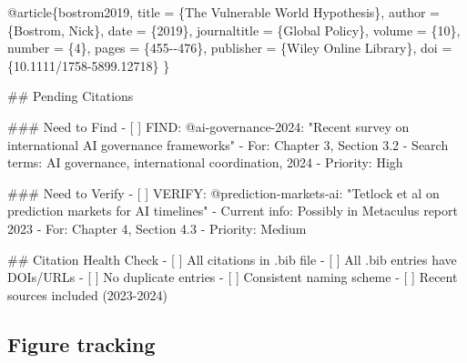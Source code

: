 \documentclass[
  11pt,
  letterpaper,
]{book}
\newenvironment{Shaded}{\begin{snugshade}}{\end{snugshade}}
\newcommand{\FunctionTok}[1]{\textcolor[rgb]{0.28,0.35,0.67}{#1}}
\newcommand{\NormalTok}[1]{\textcolor[rgb]{0.00,0.23,0.31}{#1}}
\newcommand{\SpecialStringTok}[1]{\textcolor[rgb]{0.13,0.47,0.30}{#1}}
\newcommand{\VariableTok}[1]{\textcolor[rgb]{0.07,0.07,0.07}{#1}}
\begin{document}
\begin{Shaded}
\begin{Highlighting}[]
\NormalTok{@article\{bostrom2019,}
\NormalTok{  title = \{The Vulnerable World Hypothesis\},}
\NormalTok{  author = \{Bostrom, Nick\},}
\NormalTok{  date = \{2019\},}
\NormalTok{  journaltitle = \{Global Policy\},}
\NormalTok{  volume = \{10\},}
\NormalTok{  number = \{4\},}
\NormalTok{  pages = \{455{-}{-}476\},}
\NormalTok{  publisher = \{Wiley Online Library\},}
\NormalTok{  doi = \{10.1111/1758{-}5899.12718\}}
\NormalTok{\}}




\FunctionTok{\#\# Pending Citations}

\FunctionTok{\#\#\# Need to Find}
\SpecialStringTok{{-} }\VariableTok{[ ]}\NormalTok{ FIND: @ai{-}governance{-}2024: "Recent survey on international AI governance frameworks"}
\SpecialStringTok{  {-} }\NormalTok{For: Chapter 3, Section 3.2}
\SpecialStringTok{  {-} }\NormalTok{Search terms: AI governance, international coordination, 2024}
\SpecialStringTok{  {-} }\NormalTok{Priority: High}

\FunctionTok{\#\#\# Need to Verify}
\SpecialStringTok{{-} }\VariableTok{[ ]}\NormalTok{ VERIFY: @prediction{-}markets{-}ai: "Tetlock et al on prediction markets for AI timelines"}
\SpecialStringTok{  {-} }\NormalTok{Current info: Possibly in Metaculus report 2023}
\SpecialStringTok{  {-} }\NormalTok{For: Chapter 4, Section 4.3}
\SpecialStringTok{  {-} }\NormalTok{Priority: Medium}


\FunctionTok{\#\# Citation Health Check}
\SpecialStringTok{{-} }\VariableTok{[ ]}\NormalTok{ All citations in .bib file}
\SpecialStringTok{{-} }\VariableTok{[ ]}\NormalTok{ All .bib entries have DOIs/URLs}
\SpecialStringTok{{-} }\VariableTok{[ ]}\NormalTok{ No duplicate entries}
\SpecialStringTok{{-} }\VariableTok{[ ]}\NormalTok{ Consistent naming scheme}
\SpecialStringTok{{-} }\VariableTok{[ ]}\NormalTok{ Recent sources included (2023{-}2024)}

\end{Highlighting}
\end{Shaded}

\subsection{Figure tracking}\label{figure-tracking}
\end{document}
